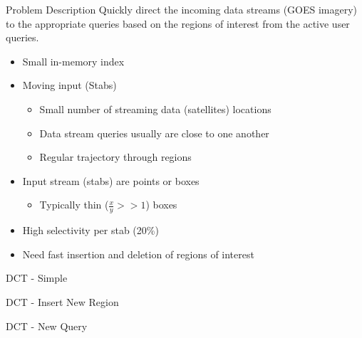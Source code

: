 \documentclass[final,total,bgColor,slideColor,pdf,ps2pdf,default,noaccumulate]{prosper}
\newcommand{\Y}{$Y$}
\begin{document}
\begin{slide}[R]{Problem Description}
  Quickly direct the incoming data streams (GOES imagery) to
  the appropriate queries based on the regions of interest from the
  active user queries.
  \begin{itemize}
  \item Small in-memory index 
  \item Moving input (Stabs)
    \begin{itemize}
    \item Small number of streaming data (satellites) locations
    \item Data stream queries usually are close to one another
    \item Regular trajectory through regions
    \end{itemize}
  \item Input stream (stabs) are points or boxes
    \begin{itemize}
    \item Typically thin ($\frac{x}{y} >> 1$) boxes
    \end{itemize}
  \item High selectivity per stab (20\%)
  \item Need fast insertion and deletion of regions of interest
  \end{itemize}
\end{slide}


\begin{slide}[R]{DCT - Simple}

\end{slide}

\begin{slide}[R]{DCT - Insert New Region}

\end{slide}

% 

% 

\begin{slide}[R]{DCT - New Query}

\end{slide}
\end{document}
